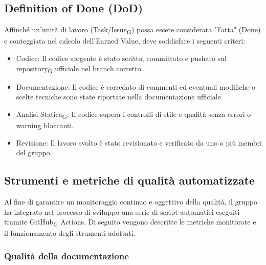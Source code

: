 \documentclass[11pt,a4paper]{article}
\newcommand{\gls}[1]{#1\textsubscript{G}}
\begin{document}
\subsection{Definition of Done (DoD)}
Affinché un'unità di lavoro (Task/\gls{Issue}) possa essere considerata "Fatta" (Done) e conteggiata nel calcolo dell'Earned Value, deve soddisfare i seguenti criteri:
\begin{itemize} 
    \item Codice: Il codice sorgente è stato scritto, committato e pushato sul \gls{repository} ufficiale nel branch corretto.
    \item Documentazione: Il codice è corredato di commenti ed eventuali modifiche o scelte tecniche sono state riportate nella documentazione ufficiale.
    \item \gls{Analisi Statica}: Il codice supera i controlli di stile e qualità senza errori o warning bloccanti. 
    \item Revisione: Il lavoro svolto è stato revisionato e verificato da uno o più membri del gruppo.
\end{itemize}

\subsection{Strumenti e metriche di qualità automatizzate}
Al fine di garantire un monitoraggio continuo e oggettivo della qualità, il gruppo ha integrato nel processo di sviluppo una serie di script automatici eseguiti tramite \gls{GitHub} Actions. Di seguito vengono descritte le metriche monitorate e il funzionamento degli strumenti adottati.

\subsubsection{Qualità della documentazione}
\end{document}

